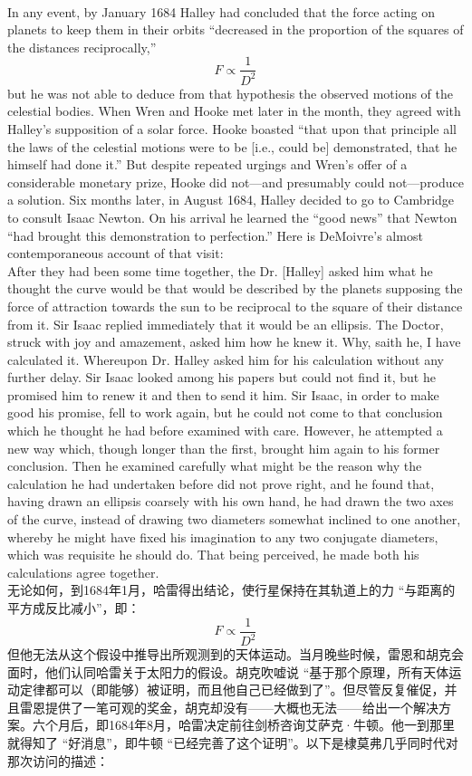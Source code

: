 \documentclass{article}
\begin{document}
\\
In any event, by January 1684 Halley had concluded that the force acting on planets to keep them in their orbits “decreased in the proportion of the squares of the distances reciprocally,” 
\[F\propto\frac{1}{D^{2}}\]
but he was not able to deduce from that hypothesis the observed motions of the celestial bodies. When Wren and Hooke met later in the month, they agreed with Halley’s supposition of a solar force. Hooke boasted “that upon that principle all the laws of the celestial motions were to be [i.e., could be] demonstrated, that he himself had done it.” But despite repeated urgings and Wren’s offer of a considerable monetary prize, Hooke did not—and presumably could not—produce a solution. Six months later, in August 1684, Halley decided to go to Cambridge to consult Isaac Newton. On his arrival he learned the “good news” that Newton “had brought this demonstration to perfection.” Here is DeMoivre’s almost contemporaneous account of that visit:\\
After they had been some time together, the Dr. [Halley] asked him what he thought the curve would be that would be described by the planets supposing the force of attraction towards the sun to be reciprocal to the square of their distance from it. Sir Isaac replied immediately that it would be an ellipsis. The Doctor, struck with joy and amazement, asked him how he knew it. Why, saith he, I have calculated it. Whereupon Dr. Halley asked him for his calculation without any further delay. Sir Isaac looked among his papers but could not find it, but he promised him to renew it and then to send it him. Sir Isaac, in order to make good his promise, fell to work again, but he could not come to that conclusion which he thought he had before examined with care. However, he attempted a new way which, though longer than the first, brought him again to his former conclusion. Then he examined carefully what might be the reason why the calculation he had undertaken before did not prove right, and he found that, having drawn an ellipsis coarsely with his own hand, he had drawn the two axes of the curve, instead of drawing two diameters somewhat inclined to one another, whereby he might have fixed his imagination to any two conjugate diameters, which was requisite he should do. That being perceived, he made both his calculations agree together.\\
无论如何，到1684年1月，哈雷得出结论，使行星保持在其轨道上的力 “与距离的平方成反比减小”，即：
\[F\propto\frac{1}{D^{2}}\]
但他无法从这个假设中推导出所观测到的天体运动。当月晚些时候，雷恩和胡克会面时，他们认同哈雷关于太阳力的假设。胡克吹嘘说 “基于那个原理，所有天体运动定律都可以（即能够）被证明，而且他自己已经做到了”。但尽管反复催促，并且雷恩提供了一笔可观的奖金，胡克却没有——大概也无法——给出一个解决方案。六个月后，即1684年8月，哈雷决定前往剑桥咨询艾萨克·牛顿。他一到那里就得知了 “好消息”，即牛顿 “已经完善了这个证明”。以下是棣莫弗几乎同时代对那次访问的描述：
\end{document}

